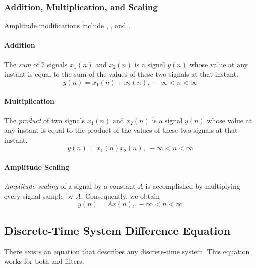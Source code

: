 \subsubsection{Addition, Multiplication, and Scaling}\label{subsubsec:Addition Multiplication and Scaling}
Amplitude modifications include , , and .

\paragraph{Addition}\label{par:Amplitude Addition}
The \emph{sum} of 2 signals $x_{1}(n)$ and $x_{2}(n)$ is a signal $y(n)$ whose value at any instant is equal to the sum of the values of these two signals at that instant.
\begin{equation}\label{eq:Amplitude Addition}
  y(n) = x_{1}(n) + x_{2}(n), \> -\infty < n < \infty
\end{equation}

\paragraph{Multiplication}\label{par:Amplitude Multiplication}
The \emph{product} of two signals $x_{1}(n)$ and $x_{2}(n)$ is a signal $y(n)$ whose value at any instant is equal to the product of the values of these two signals at that instant.
\begin{equation}\label{eq:Amplitude Multiplication}
  y(n) = x_{1}(n) x_{2}(n), \> -\infty < n < \infty
\end{equation}

\paragraph{Amplitude Scaling}\label{par:Amplitude Scaling}
\emph{Amplitude scaling} of a signal by a constant $A$ is accomplished by multiplying every signal sample by $A$.
Consequently, we obtain
\begin{equation}\label{eq:Amplitude Scaling}
  y(n) = A x(n), \> -\infty < n < \infty
\end{equation}

\subsection{Discrete-Time System Difference Equation}\label{subsec:Discrete-Time_System_Difference_Equation}
There exists an equation that describes any  discrete-time system.
This equation works for both  and  filters.

